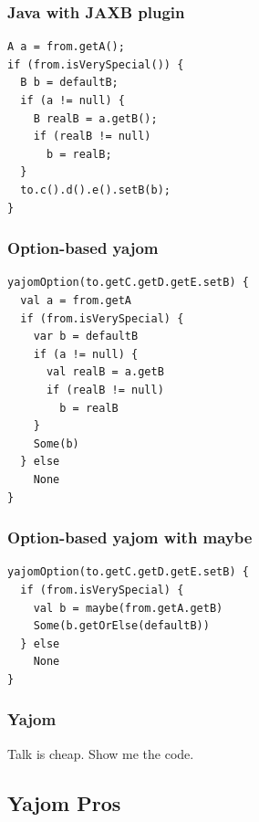 \documentclass[14pt]{beamer}
\begin{document}
\begin{frame}[fragile]
\frametitle{Java with JAXB plugin}
\begin{lstlisting}
A a = from.getA();
if (from.isVerySpecial()) {
  B b = defaultB;
  if (a != null) {
    B realB = a.getB();
    if (realB != null)
      b = realB; 
  } 
  to.c().d().e().setB(b);
}
\end{lstlisting}
\end{frame}

\begin{frame}[fragile]
\frametitle{Option-based yajom}
\begin{lstlisting}
yajomOption(to.getC.getD.getE.setB) {
  val a = from.getA
  if (from.isVerySpecial) {
    var b = defaultB
    if (a != null) {
      val realB = a.getB
      if (realB != null)
        b = realB
    }
    Some(b)
  } else
    None
}
\end{lstlisting}
\end{frame}

\begin{frame}[fragile]
\frametitle{Option-based yajom with maybe}
\begin{lstlisting}
yajomOption(to.getC.getD.getE.setB) {
  if (from.isVerySpecial) {
    val b = maybe(from.getA.getB)
    Some(b.getOrElse(defaultB))
  } else
    None
}
\end{lstlisting}
\end{frame}

\frame
{\frametitle{Yajom}
\begin{center}
  \large Talk is cheap. Show me the code.
\end{center}
}

\subsection{Yajom Pros}
\end{document}
